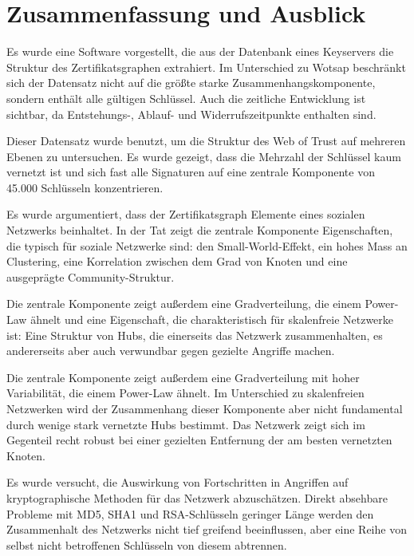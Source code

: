 
\chapter{Zusammenfassung und Ausblick}
\label{ch:Zusammenfassung}

Es wurde eine Software vorgestellt, die aus der Datenbank eines
Keyservers die Struktur des Zertifikatsgraphen extrahiert. Im
Unterschied zu Wotsap beschränkt sich der Datensatz nicht auf die
größte starke Zusammenhangskomponente, sondern enthält alle
g\"ultigen Schlüssel. Auch die zeitliche Entwicklung ist sichtbar, da
Entstehungs-, Ablauf- und Widerrufszeitpunkte enthalten sind.

Dieser Datensatz wurde benutzt, um die Struktur des Web of Trust auf
mehreren Ebenen zu untersuchen. Es wurde gezeigt, dass die Mehrzahl
der Schlüssel kaum vernetzt ist und sich fast alle Signaturen auf
eine zentrale Komponente von 45.000 Schlüsseln konzentrieren. 

Es wurde argumentiert, dass der Zertifikatsgraph Elemente eines
sozialen Netzwerks beinhaltet. In der Tat zeigt die zentrale
Komponente Eigenschaften, die typisch für soziale Netzwerke sind:
den Small-World-Effekt, ein hohes Mass an Clustering, eine Korrelation
zwischen dem Grad von Knoten und eine ausgeprägte
Community-Struktur.

Die zentrale Komponente zeigt außerdem eine Gradverteilung, die einem
Power-Law ähnelt und eine Eigenschaft, die charakteristisch für
skalenfreie Netzwerke ist: Eine Struktur von Hubs, die einerseits das
Netzwerk zusammenhalten, es andererseits aber auch verwundbar gegen
gezielte Angriffe machen. 

Die zentrale Komponente zeigt au{\ss}erdem eine Gradverteilung mit
hoher Variabilit\"at, die einem Power-Law \"ahnelt. Im Unterschied zu
skalenfreien Netzwerken wird der Zusammenhang dieser Komponente aber
nicht fundamental durch wenige stark vernetzte Hubs bestimmt. Das
Netzwerk zeigt sich im Gegenteil recht robust bei einer gezielten
Entfernung der am besten vernetzten Knoten.

Es wurde versucht, die Auswirkung von Fortschritten in Angriffen auf
kryptographische Methoden für das Netzwerk abzuschätzen. Direkt
absehbare Probleme mit MD5, SHA1 und RSA-Schlüsseln geringer Länge
werden den Zusammenhalt des Netzwerks nicht tief greifend beeinflussen,
aber eine Reihe von selbst nicht betroffenen Schlüsseln von diesem
abtrennen.


